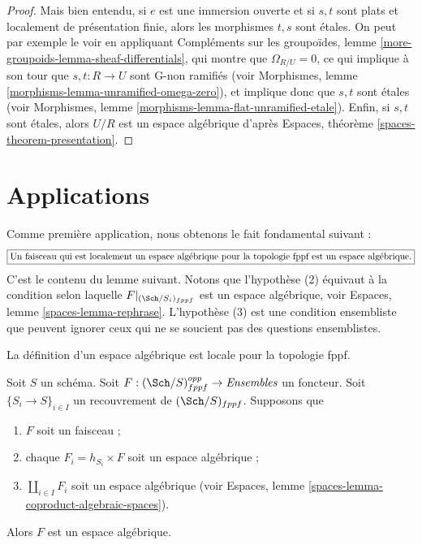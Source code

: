 \begin{proof}
\medskip\noindent
Mais bien entendu, si $e$ est une immersion ouverte et si
$s, t$ sont plats et localement de présentation finie,
alors les morphismes $t, s$ sont étales.
On peut par exemple le voir en appliquant
Compléments sur les groupoïdes, lemme \ref{more-groupoids-lemma-sheaf-differentials},
qui montre que $\Omega_{R/U} = 0$, ce qui implique à son tour
que $s, t : R \to U$ sont G-non ramifiés (voir
Morphismes, lemme \ref{morphisms-lemma-unramified-omega-zero}),
et implique donc que $s, t$ sont étales (voir
Morphismes, lemme \ref{morphisms-lemma-flat-unramified-etale}).
Enfin, si $s, t$ sont étales, alors $U/R$ est un espace
algébrique d'après
Espaces, théorème \ref{spaces-theorem-presentation}.
\end{proof}





\section{Applications}
\label{section-applications}

\noindent
Comme première application, nous obtenons le fait fondamental suivant :
$$
\fbox{Un faisceau qui est localement un espace algébrique pour la topologie fppf est un espace algébrique.}
$$
C'est le contenu du lemme suivant.
Notons que l'hypothèse (2) équivaut à la condition selon laquelle
$F|_{(\Sch/S_i)_{fppf}}$ est un espace algébrique, voir
Espaces, lemme \ref{spaces-lemma-rephrase}.
L'hypothèse (3) est une condition ensembliste que peuvent ignorer
ceux qui ne se soucient pas des questions ensemblistes.

\begin{lemma}
\label{lemma-locally-algebraic-space}
\begin{slogan}
La définition d'un espace algébrique est locale pour la topologie fppf.
\end{slogan}
Soit $S$ un schéma.
Soit $F : (\Sch/S)_{fppf}^{opp} \to \textit{Ensembles}$ un foncteur.
Soit $\{S_i \to S\}_{i \in I}$ un recouvrement de $(\Sch/S)_{fppf}$.
Supposons que
\begin{enumerate}
\item $F$ soit un faisceau ;
\item chaque $F_i = h_{S_i} \times F$ soit un espace algébrique ;
\item $\coprod_{i \in I} F_i$ soit un espace algébrique (voir
Espaces, lemme \ref{spaces-lemma-coproduct-algebraic-spaces}).
\end{enumerate}
Alors $F$ est un espace algébrique.
\end{lemma}

